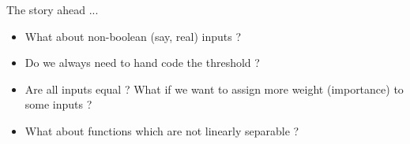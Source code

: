 \begin{frame}
	\begin{block}{The story ahead ...}
			\begin{itemize}\justifying
				\item<1-> What about non-boolean (say, real) inputs ?
				\item<2-> Do we always need to hand code the threshold ?
				\item<3-> Are all inputs equal ? What if we want to assign more weight (importance) to some inputs ?
				\item<4-> What about functions which are not linearly separable ?
			\end{itemize}
	\end{block}
\end{frame}
